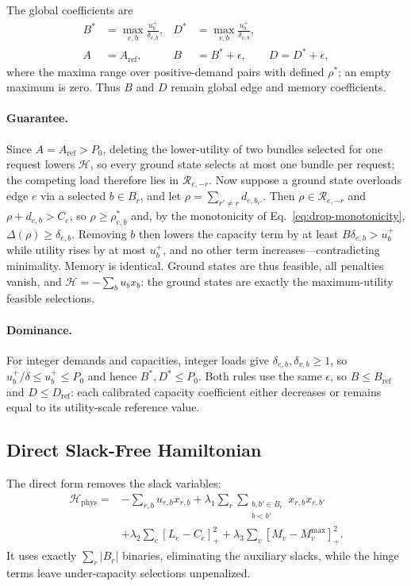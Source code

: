\documentclass[twocolumn]{article}
\newcommand{\calH}{\mathcal{H}}
\begin{document}
The global coefficients are
\begin{align}
  B^*&=\max_{e,b}\frac{u_b^+}{\delta_{e,b}}, &
  D^*&=\max_{v,b}\frac{u_b^+}{\delta_{v,b}},\\
  A&=A_{\mathrm{ref}}, &
  B&=B^*+\epsilon,\qquad D=D^*+\epsilon,
  \label{eq:reachable-calibration}
\end{align}
where the maxima range over positive-demand pairs with defined
$\rho^*$; an empty maximum is zero.  Thus $B$ and $D$ remain global
edge and memory coefficients.

\paragraph{Guarantee.}
Since $A=A_{\mathrm{ref}}>P_0$, deleting the lower-utility of two bundles
selected for one request lowers $\calH$, so every ground state selects at
most one bundle per request; the competing load therefore lies in
$\mathcal R_{e,-r}$.  Now suppose a ground state overloads edge $e$ via a
selected $b\in B_r$, and let $\rho=\sum_{r'\neq r}d_{e,b_{r'}}$.  Then
$\rho\in\mathcal R_{e,-r}$ and $\rho+d_{e,b}>C_e$, so
$\rho\ge\rho^*_{e,b}$ and, by the monotonicity of
Eq.~\eqref{eq:drop-monotonicity}, $\Delta(\rho)\ge\delta_{e,b}$.
Removing $b$ then lowers the capacity term by at least
$B\delta_{e,b}>u_b^+$ while utility rises by at most $u_b^+$, and no
other term increases---contradicting minimality.  Memory is identical.
Ground states are thus feasible, all penalties vanish, and
$\calH=-\sum_b u_bx_b$: the ground states are exactly the maximum-utility
feasible selections.

\paragraph{Dominance.}
For integer demands and capacities, integer loads give
$\delta_{e,b},\delta_{v,b}\ge1$, so $u_b^+/\delta\le u_b^+\le P_0$ and
hence $B^*,D^*\le P_0$.  Both rules use the same $\epsilon$, so
$B\le B_{\mathrm{ref}}$ and $D\le D_{\mathrm{ref}}$: each calibrated
capacity coefficient either decreases or remains equal to its
utility-scale reference value.

\subsection{Direct Slack-Free Hamiltonian}
\label{sec:direct}

The direct form removes the slack variables:
\begin{equation}
\begin{aligned}
  \calH_{\text{phys}}
  ={}&-\sum_{r,b}u_{r,b}x_{r,b}
  +\lambda_1\sum_r
    \sum_{\substack{b,b'\in B_r\\b<b'}}x_{r,b}x_{r,b'}\\
  &+\lambda_2\sum_e[L_e-C_e]_+^2
  +\lambda_3\sum_v[M_v-M_v^{\max}]_+^2.
\end{aligned}
\label{eq:direct-ham}
\end{equation}
It uses exactly $\sum_r |B_r|$ binaries, eliminating the auxiliary
slacks, while the hinge terms leave under-capacity selections
unpenalized.
\end{document}

